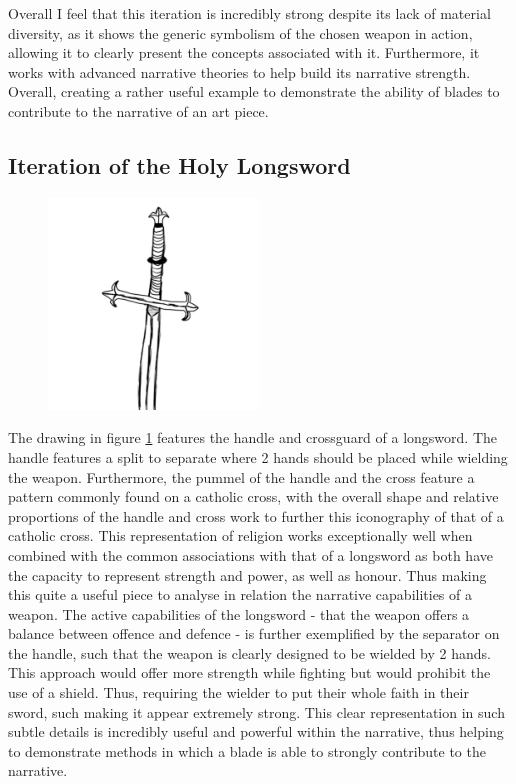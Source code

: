 \documentclass{article}
\begin{document}
Overall I feel that this iteration is incredibly strong despite its lack of material diversity, as it shows the generic symbolism of the chosen weapon in action, allowing it to clearly present the concepts associated with it. Furthermore, it works with advanced narrative theories to help build its narrative strength. Overall, creating a rather useful example to demonstrate the ability of blades to contribute to the narrative of an art piece.

\pagebreak

\subsection{Iteration of the Holy Longsword} \label{Iteration5}

\begin{figure}[h]
    \centering
    \caption{}
    \includegraphics[width=0.5\textwidth]{drawings/HolyLongsword.png}
    \label{fig:HolyLongsword}
\end{figure}

The drawing in figure \ref{fig:HolyLongsword} features the handle and crossguard of a longsword. The handle features a split to separate where 2 hands should be placed while wielding the weapon. Furthermore, the pummel of the handle and the cross feature a pattern commonly found on a catholic cross, with the overall shape and relative proportions of the handle and cross work to further this iconography of that of a catholic cross. This representation of religion works exceptionally well when combined with the common associations with that of a longsword as both have the capacity to represent strength and power, as well as honour. Thus making this quite a useful piece to analyse in relation the narrative capabilities of a weapon. The active capabilities of the longsword - that the weapon offers a balance between offence and defence - is further exemplified by the separator on the handle, such that the weapon is clearly designed to be wielded by 2 hands. This approach would offer more strength while fighting but would prohibit the use of a shield. Thus, requiring the wielder to put their whole faith in their sword, such making it appear extremely strong. This clear representation in such subtle details is incredibly useful and powerful within the narrative, thus helping to demonstrate methods in which a blade is able to strongly contribute to the narrative.
\end{document}
